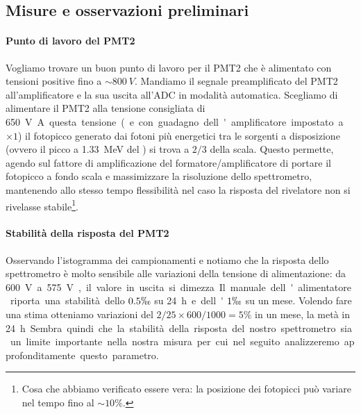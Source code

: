 \subsection{Misure e osservazioni preliminari}

\paragraph{Punto di lavoro del PMT2}
Vogliamo trovare un buon punto di lavoro per il PMT2 che è alimentato con tensioni positive fino a $\sim \SI{800}{V}$. 
Mandiamo il segnale preamplificato del PMT2 all'amplificatore e la sua uscita all'ADC in modalità automatica.
Scegliamo di alimentare il PMT2 alla tensione consigliata di \SI{650}V. A questa tensione (e con guadagno dell'amplificatore impostato a $\times 1$) il fotopicco generato dai fotoni più energetici tra le sorgenti a disposizione (ovvero il picco a \SI{1.33}{MeV} del \co) si trova a $2/3$ della scala. Questo permette, agendo sul fattore di amplificazione del formatore/amplificatore di portare il fotopicco a fondo scala  e massimizzare la risoluzione dello spettrometro, mantenendo allo stesso tempo flessibilità nel caso la risposta del rivelatore non si rivelasse stabile\footnote{Cosa che abbiamo verificato essere vera: la posizione dei fotopicci può variare nel tempo fino al $\sim 10\%$.}.

\paragraph{Stabilità della risposta del PMT2}
Osservando l'istogramma dei campionamenti e notiamo che la risposta dello spettrometro è molto sensibile alle variazioni della tensione di alimentazione: da \SI{600}V a \SI{575}V, il valore in uscita si dimezza.
Il manuale dell'alimentatore riporta una stabilità dello $0.5\permil$ su \SI{24}h e dell' $1\permil$ su un mese. Volendo fare una stima otteniamo variazioni del $2/25 \times 600/1000 = 5\%$ in un mese, la metà in \SI{24}h. Sembra quindi che la stabilità della risposta del nostro spettrometro sia un limite importante nella nostra misura per cui nel seguito analizzeremo approfonditamente questo parametro.

